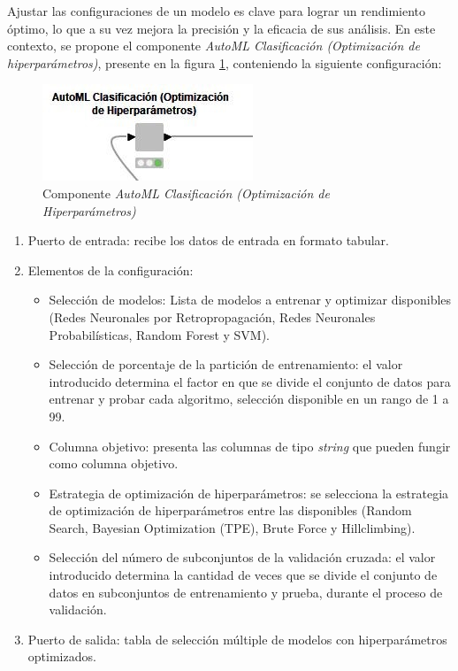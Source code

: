 Ajustar las configuraciones de un modelo es clave para lograr un rendimiento óptimo, lo que a su vez mejora la precisión y la eficacia de sus análisis. En este contexto, se propone el componente \textit{AutoML Clasificación (Optimización de hiperparámetros)},  presente en la figura \ref{fig:automl-componente-hpo}, conteniendo la siguiente configuración:

\begin{figure}[H]
	\centering
	\includegraphics[width=0.35\linewidth]{"figuras/capi 2/hpo/automl-componente-hpo"}
	\caption[Componente AutoML Clasificación (Optimización de Hiperparámetros)]{Componente \textit{AutoML Clasificación (Optimización de Hiperparámetros)}}
	\label{fig:automl-componente-hpo}
\end{figure}
\begin{enumerate}
	\item Puerto de entrada: recibe los datos de entrada en formato tabular.
	\item Elementos de la configuración:
	\begin{itemize}
		\item Selección de modelos: Lista de modelos a entrenar y optimizar disponibles (Redes Neuronales por Retropropagación, Redes Neuronales Probabilísticas, Random Forest y SVM).
		\item Selección de porcentaje de la partición de entrenamiento: el valor introducido determina el factor en que se divide el conjunto de datos para entrenar y probar cada algoritmo, selección disponible en un rango de 1 a 99. 
		\item Columna objetivo: presenta las columnas de tipo \textit{string} que pueden fungir como columna objetivo.
		\item Estrategia de optimización de hiperparámetros: se selecciona la estrategia de optimización de hiperparámetros entre las disponibles (Random Search, Bayesian Optimization (TPE), Brute Force y Hillclimbing).
		\item Selección del número de subconjuntos de la validación cruzada: el valor introducido determina la cantidad de veces que se divide el conjunto de datos en subconjuntos de entrenamiento y prueba, durante el proceso de validación.
	\end{itemize}
	\item Puerto de salida: tabla de selección múltiple de modelos con hiperparámetros optimizados.
\end{enumerate}

